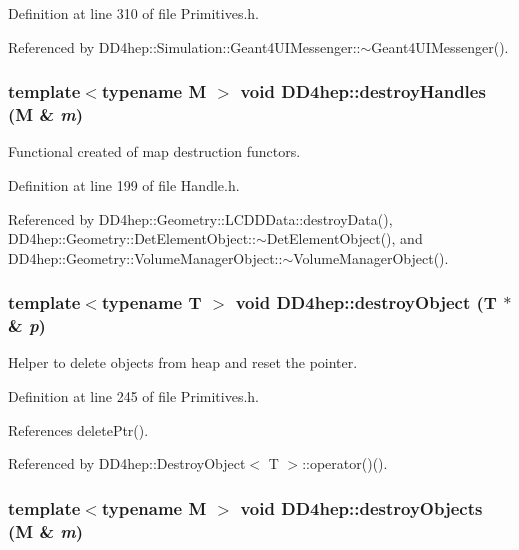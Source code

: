 Definition at line 310 of file Primitives.h.

Referenced by DD4hep::Simulation::Geant4UIMessenger::$\sim$Geant4UIMessenger().\hypertarget{namespace_d_d4hep_a9140f54e01a0678bcf38ca73f4d166ef}{
\subsubsection[{destroyHandles}]{\setlength{\rightskip}{0pt plus 5cm}template$<$typename M $>$ void DD4hep::destroyHandles (M \& {\em m})}}
\label{namespace_d_d4hep_a9140f54e01a0678bcf38ca73f4d166ef}


Functional created of map destruction functors. 

Definition at line 199 of file Handle.h.

Referenced by DD4hep::Geometry::LCDDData::destroyData(), DD4hep::Geometry::DetElementObject::$\sim$DetElementObject(), and DD4hep::Geometry::VolumeManagerObject::$\sim$VolumeManagerObject().\hypertarget{namespace_d_d4hep_af0262338b8839e71107ce4303ccf4ee3}{
\subsubsection[{destroyObject}]{\setlength{\rightskip}{0pt plus 5cm}template$<$typename T $>$ void DD4hep::destroyObject ({\bf T} $\ast$\& {\em p})}}
\label{namespace_d_d4hep_af0262338b8839e71107ce4303ccf4ee3}


Helper to delete objects from heap and reset the pointer. 

Definition at line 245 of file Primitives.h.

References deletePtr().

Referenced by DD4hep::DestroyObject$<$ T $>$::operator()().\hypertarget{namespace_d_d4hep_af315e60d3775e6d538af26f0506d3cd4}{
\subsubsection[{destroyObjects}]{\setlength{\rightskip}{0pt plus 5cm}template$<$typename M $>$ void DD4hep::destroyObjects (M \& {\em m})}}
\label{namespace_d_d4hep_af315e60d3775e6d538af26f0506d3cd4}


